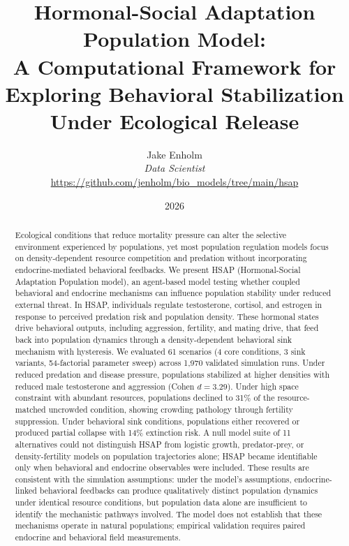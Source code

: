 \documentclass[11pt]{article}
\title{Hormonal-Social Adaptation Population Model:\\
A Computational Framework for Exploring Behavioral Stabilization Under Ecological Release}
\author{Jake Enholm\\
\textit{Data Scientist}\\
\small\url{https://github.com/jenholm/bio_models/tree/main/hsap}}
\date{2026}
\begin{document}
\maketitle

\begin{abstract}
Ecological conditions that reduce mortality pressure can alter the selective environment experienced by populations, yet most population regulation models focus on density-dependent resource competition and predation without incorporating endocrine-mediated behavioral feedbacks. We present HSAP (Hormonal-Social Adaptation Population model), an agent-based model testing whether coupled behavioral and endocrine mechanisms can influence population stability under reduced external threat. In HSAP, individuals regulate testosterone, cortisol, and estrogen in response to perceived predation risk and population density. These hormonal states drive behavioral outputs, including aggression, fertility, and mating drive, that feed back into population dynamics through a density-dependent behavioral sink mechanism with hysteresis. We evaluated 61 scenarios (4 core conditions, 3 sink variants, 54-factorial parameter sweep) across 1,970 validated simulation runs. Under reduced predation and disease pressure, populations stabilized at higher densities with reduced male testosterone and aggression (Cohen $d=3.29$). Under high space constraint with abundant resources, populations declined to 31\% of the resource-matched uncrowded condition, showing crowding pathology through fertility suppression. Under behavioral sink conditions, populations either recovered or produced partial collapse with 14\% extinction risk. A null model suite of 11 alternatives could not distinguish HSAP from logistic growth, predator-prey, or density-fertility models on population trajectories alone; HSAP became identifiable only when behavioral and endocrine observables were included. These results are consistent with the simulation assumptions: under the model's assumptions, endocrine-linked behavioral feedbacks can produce qualitatively distinct population dynamics under identical resource conditions, but population data alone are insufficient to identify the mechanistic pathways involved. The model does not establish that these mechanisms operate in natural populations; empirical validation requires paired endocrine and behavioral field measurements.
\end{abstract}










\end{document}
